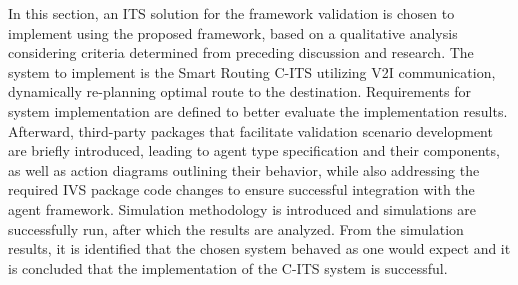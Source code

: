 \documentclass[0main.tex]{subfiles}
\begin{document}
In this section, an ITS solution for the framework validation is chosen to implement
using the proposed framework, based on a qualitative analysis considering criteria determined
from preceding discussion and research. The system to implement is the Smart Routing C-ITS
utilizing V2I communication, dynamically re-planning optimal route to the destination. Requirements
for system implementation are defined to better evaluate the implementation results.
Afterward, third-party packages that facilitate validation scenario development are briefly
introduced, leading to agent type specification and their components, as well as
action diagrams outlining their behavior, while also addressing the required IVS package code
changes to ensure successful integration with the agent framework. Simulation methodology is
introduced and simulations are successfully run, after which the results are analyzed. From the 
simulation results, it is identified that the chosen system behaved as one would expect and it
is concluded that the implementation of the C-ITS system is successful. 
\end{document}
